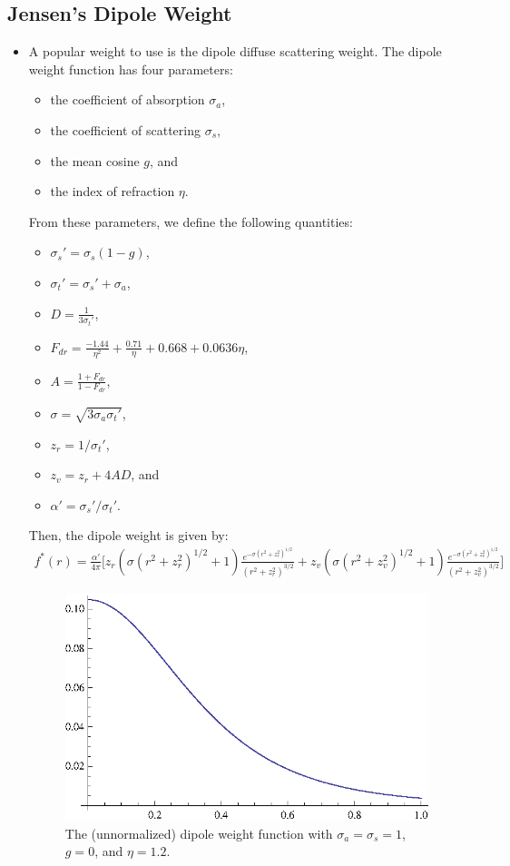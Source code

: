 \documentclass[10pt]{article}
\begin{document}
		
\subsection{Jensen's Dipole Weight}
\begin{itemize}
	\item A popular weight to use is the dipole diffuse scattering weight.
		The dipole weight function has four parameters:
		\begin{itemize}
			\item the coefficient of absorption $\sigma_a$,
			\item the coefficient of scattering $\sigma_s$,
			\item the mean cosine $g$, and
			\item the index of refraction $\eta$.			
		\end{itemize}
		From these parameters, we define the following quantities:
		\begin{itemize}
			\item $\sigma_s' = \sigma_s (1 - g)$,
			\item $\sigma_t' = \sigma_s' + \sigma_a$,
			\item $D = \frac{1}{3 \sigma_t'}$,
			\item $F_{dr} = \frac{-1.44}{\eta^2} + \frac{0.71}{\eta} + 0.668 + 0.0636\eta$,
			\item $A = \frac{1+F_{dr}}{1-F_{dr}}$,
			\item $\sigma = \sqrt{3 \sigma_a \sigma_t' }$,
			\item $z_r = 1 / \sigma_t'$,
			\item $z_v = z_r + 4AD$, and
			\item $\alpha' = \sigma_s' / \sigma_t'$.
		\end{itemize}
		Then, the dipole weight is given by:
		\begin{align*}
			f^*(r) = \frac{\alpha'}{4\pi} 
			\bigg[ z_r( \sigma (r^2 + z_r^2)^{1/2} + 1) 
			\frac{e^{-\sigma (r^2 + z^2_r)^{1/2}}}{(r^2 + z^2_r)^{3/2}} + 
			z_v( \sigma (r^2 + z_v^2)^{1/2} + 1) 
			\frac{e^{-\sigma (r^2 + z^2_v)^{1/2}}}{(r^2 + z^2_v)^{3/2}} \bigg]
		\end{align*}
		
		\begin{figure}[h]
			\centering
			\includegraphics{dipole.eps}
			\caption{The (unnormalized) dipole weight function with $\sigma_a = \sigma_s = 1$, $g = 0$, and $\eta = 1.2$.}
		\end{figure}
		

\end{itemize}
\end{document}
